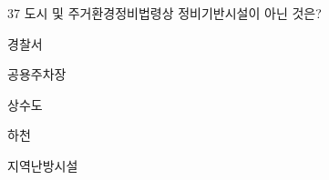 \begin{question}{37}
도시 및 주거환경정비법령상 정비기반시설이 아닌 것은?
\begin{choices}
  \item 경찰서
  \item 공용주차장
  \item 상수도
  \item 하천
  \item 지역난방시설
\end{choices}
\end{question}
